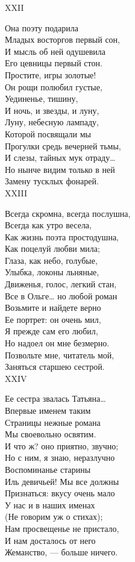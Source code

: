 XXII

Она поэту подарила\\
Младых восторгов первый сон,\\
И мысль об ней одушевила\\
Его цевницы первый стон.\\
Простите, игры золотые!\\
Он рощи полюбил густые,\\
Уединенье, тишину,\\
И ночь, и звезды, и луну,\\
Луну, небесную лампаду,\\
Которой посвящали мы\\
Прогулки средь вечерней тьмы,\\
И слезы, тайных мук отраду…\\
Но нынче видим только в ней\\
Замену тусклых фонарей.\\

XXIII

Всегда скромна, всегда послушна,\\
Всегда как утро весела,\\
Как жизнь поэта простодушна,\\
Как поцелуй любви мила;\\
Глаза, как небо, голубые,\\
Улыбка, локоны льняные,\\
Движенья, голос, легкий стан,\\
Все в Ольге… но любой роман\\
Возьмите и найдете верно\\
Ее портрет: он очень мил,\\
Я прежде сам его любил,\\
Но надоел он мне безмерно.\\
Позвольте мне, читатель мой,\\
Заняться старшею сестрой.\\

XXIV

Ее сестра звалась Татьяна…\\
Впервые именем таким\\
Страницы нежные романа\\
Мы своевольно освятим.\\
И что ж? оно приятно, звучно;\\
Но с ним, я знаю, неразлучно\\
Воспоминанье старины\\
Иль девичьей! Мы все должны\\
Признаться: вкусу очень мало\\
У нас и в наших именах\\
(Не говорим уж о стихах);\\
Нам просвещенье не пристало,\\
И нам досталось от него\\
Жеманство, — больше ничего.\\

